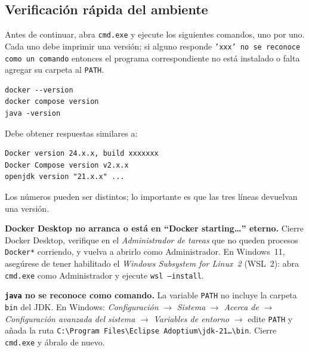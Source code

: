 \documentclass[11pt,a4paper]{article}
\begin{document}
\subsection{Verificaci\'on r\'apida del ambiente}

Antes de continuar, abra \texttt{cmd.exe} y ejecute los siguientes comandos, uno por uno. Cada uno debe imprimir una versi\'on; si alguno responde \texttt{'xxx' no se reconoce como un comando} entonces el programa correspondiente no est\'a instalado o falta agregar su carpeta al \texttt{PATH}.

\begin{lstlisting}[style=bashstyle,caption={Verificaci\'on del ambiente en cmd.exe}]
docker --version
docker compose version
java -version
\end{lstlisting}

\begin{verifbox}
Debe obtener respuestas similares a:

\begin{lstlisting}[style=plainstyle]
Docker version 24.x.x, build xxxxxxx
Docker Compose version v2.x.x
openjdk version "21.x.x" ...
\end{lstlisting}

Los n\'umeros pueden ser distintos; lo importante es que las tres l\'ineas devuelvan una versi\'on.
\end{verifbox}

\begin{errorbox}
\textbf{Docker Desktop no arranca o est\'a en ``Docker starting\ldots'' eterno.} Cierre Docker Desktop, verifique en el \emph{Administrador de tareas} que no queden procesos \texttt{Docker*} corriendo, y vuelva a abrirlo como Administrador. En Windows~11, aseg\'urese de tener habilitado el \emph{Windows Subsystem for Linux~2} (WSL~2): abra \texttt{cmd.exe} como Administrador y ejecute \texttt{wsl --install}.

\textbf{\texttt{java} no se reconoce como comando.} La variable \texttt{PATH} no incluye la carpeta \texttt{bin} del JDK. En Windows: \emph{Configuraci\'on} $\rightarrow$ \emph{Sistema} $\rightarrow$ \emph{Acerca de} $\rightarrow$ \emph{Configuraci\'on avanzada del sistema} $\rightarrow$ \emph{Variables de entorno} $\rightarrow$ edite \texttt{PATH} y a\~nada la ruta \texttt{C:\textbackslash Program Files\textbackslash Eclipse Adoptium\textbackslash jdk-21\ldots\textbackslash bin}. Cierre \texttt{cmd.exe} y \'abralo de nuevo.
\end{errorbox}
\end{document}
